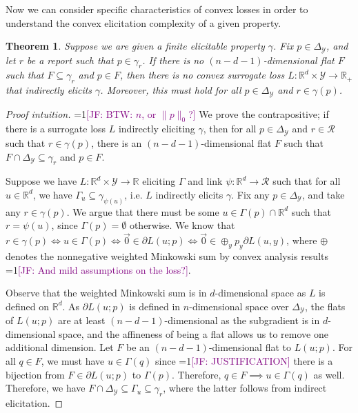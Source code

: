 \documentclass{article}
\newcommand{\Comments}{1}
\newcommand{\mynote}[2]{\ifnum\Comments=1\textcolor{#1}{#2}\fi}
\newcommand{\jessie}[1]{\mynote{purple}{[JF: #1]}}
\newcommand{\reals}{\mathbb{R}}
\newcommand{\simplex}{\Delta_\Y}
\newcommand{\R}{\mathcal{R}}
\newcommand{\Y}{\mathcal{Y}}
\newtheorem{theorem}{Theorem}
\begin{document}
Now we can consider specific characteristics of convex losses in order to understand the convex elicitation complexity of a given property.

\begin{theorem}\label{thm:cvx-flats}
	Suppose we are given a finite elicitable property $\gamma$.
	Fix $p \in \simplex$, and let $r$ be a report such that $p \in \gamma_r$.  
	If there is no $(n - d - 1)$-dimensional flat $F$ such that $F \subseteq \gamma_r$ and $p \in F$, then there is no convex surrogate loss $L : \reals^d \times \Y \to \reals_+$ that indirectly elicits $\gamma$.
	Moreover, this must hold for all $p \in \simplex$ and $r \in \gamma(p)$.
\end{theorem}
\begin{proof}[Proof intuition]
	\jessie{BTW: $n$, or $\|p\|_0$?}
	We prove the contrapositive; if there is a surrogate loss $L$ indirectly eliciting $\gamma$, then for all $p \in \simplex$ and $r \in \R$ such that $r \in \gamma(p)$, there is an $(n-d-1)$-dimensional flat $F$ such that $F \cap \simplex \subseteq \gamma_r$ and $p \in F$.
	
	Suppose we have $L:\reals^d \times \Y \to \reals$ eliciting $\Gamma$ and link $\psi : \reals^d \to \R$ such that for all $u \in \reals^d$, we have $\Gamma_u \subseteq \gamma_{\psi(u)}$, i.e. $L$ indirectly elicits $\gamma$.
	Fix any $p \in \simplex$, and take any $r \in \gamma(p)$.
	We argue that there must be some $u \in \Gamma(p) \cap \reals^d$ such that $r = \psi(u)$, since $\Gamma(p) = \emptyset$ otherwise.
	We know that $r \in \gamma(p) \iff u \in \Gamma(p) \iff \vec 0 \in \partial L(u; p) \iff \vec 0 \in \oplus_y p_y \partial L(u,y)$, where $\oplus$ denotes the nonnegative weighted Minkowski sum by convex analysis results \jessie{And mild assumptions on the loss?}.
		
	Observe that the weighted Minkowski sum is in $d$-dimensional space as $L$ is defined on $\reals^d$.
	As $\partial L(u;p)$ is defined in $n$-dimensional space over $\simplex$, the flats of $L(u;p)$ are at least $(n-d-1)$-dimensional as the subgradient is in $d$-dimensional space, and the affineness of being a flat allows us to remove one additional dimension.
	Let $F$ be an $(n-d-1)$-dimensional flat to $L(u;p)$.
	For all $q \in F$, we must have $u \in \Gamma(q)$ since \jessie{JUSTIFICATION} there is a bijection from $F \in \partial L(u;p)$ to $\Gamma(p)$. Therefore, $q \in F \implies u \in \Gamma(q)$ as well.
	Therefore, we have $F \cap \simplex \subseteq \Gamma_u \subseteq \gamma_r$, where the latter follows from indirect elicitation.
	

\end{proof}
\end{document}
